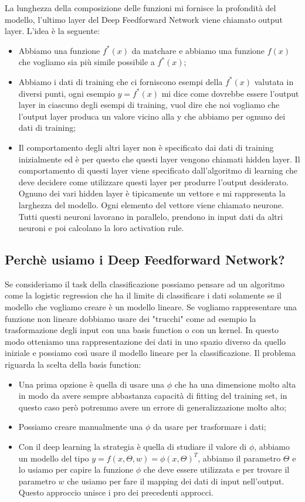 \documentclass[14pt]{extreport}
\begin{document}
La lunghezza della composizione delle funzioni mi fornisce la profondità del modello, l'ultimo layer del Deep Feedforward Network viene chiamato
output layer. L'idea è la seguente:
\begin{itemize}
\item Abbiamo una funzione $f^*(x)$ da matchare e abbiamo una funzione $f(x)$ che vogliamo sia più simile possibile a $f^*(x)$;
\item Abbiamo i dati di training che ci forniscono esempi della $f^*(x)$ valutata in diversi punti, ogni esempio $y = f^*(x)$ mi dice come dovrebbe
essere l'output layer in ciascuno degli esempi di training, vuol dire che noi vogliamo che l'output layer produca un valore vicino alla y che abbiamo
per ognuno dei dati di training;
\item Il comportamento degli altri layer non è specificato dai dati di training inizialmente ed è per questo che questi layer vengono chiamati hidden
layer. Il comportamento di questi layer viene specificato dall'algoritmo di learning che deve decidere come utilizzare questi layer per produrre
l'output desiderato. Ognuno dei vari hidden layer è tipicamente un vettore e mi rappresenta la larghezza del modello. Ogni elemento del vettore viene
chiamato neurone. Tutti questi neuroni lavorano in parallelo, prendono in input dati da altri neuroni e poi calcolano la loro activation rule.
\end{itemize}


\subsection{Perchè usiamo i Deep Feedforward Network?}

Se consideriamo il task della classificazione possiamo pensare ad un algoritmo come la logistic regression che ha il limite di classificare i dati
solamente se il modello che vogliamo creare è un modello lineare. Se vogliamo rappresentare una funzione non lineare dobbiamo usare dei "trucchi" come
ad esempio la trasformazione degli input con una basis function o con un kernel. In questo modo otteniamo una rappresentazione dei dati in uno spazio
diverso da quello iniziale e possiamo così usare il modello lineare per la classificazione. Il problema riguarda la scelta della basis function:
\begin{itemize}
\item Una prima opzione è quella di usare una $\phi$ che ha una dimensione molto alta in modo da avere sempre abbastanza capacità di fitting del
training set, in questo caso però potremmo avere un errore di generalizzazione molto alto;
\item Possiamo creare manualmente una $\phi$ da usare per trasformare i dati;
\item Con il deep learning la strategia è quella di studiare il valore di $\phi$, abbiamo un modello del tipo $y = f(x, \Theta, w) = \phi(x,
\Theta)^T$, abbiamo il parametro $\Theta$ e lo usiamo per capire la funzione $\phi$ che deve essere utilizzata e per trovare il parametro $w$ che
usiamo per fare il mapping dei dati di input nell'output. Questo approccio unisce i pro dei precedenti approcci.
\end{itemize}
\end{document}
